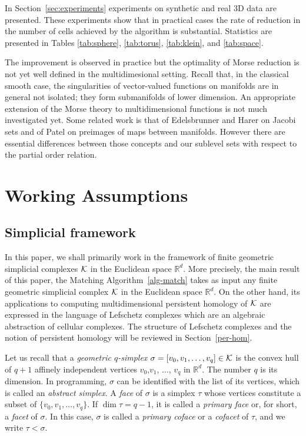 \documentclass[12pt]{article}
\newcommand{\R}{{\mathbb R}}
\newcommand{\cK}{{\cal K}}
\begin{document}
In Section~\ref{sec:experiments} experiments on synthetic and real 3D data are presented. These experiments show that in practical cases the rate of reduction in the number of cells achieved by the algorithm is substantial. Statistics are presented in Tables \ref{tab:sphere}, \ref{tab:torus}, \ref{tab:klein}, and \ref{tab:space}.

The improvement is observed in practice but the optimality of Morse reduction is not yet well defined in the multidimesional setting. Recall that, in the classical smooth case, the singularities of vector-valued functions on manifolds are in general not isolated; they form submanifolds of lower dimension. An appropriate extension of the Morse theory to multidimensional functions is not much investigated yet. Some related work is that of Edelsbrunner and Harer \cite{EdHa02} on Jacobi sets and of Patel \cite{Pat10} on preimages of maps between manifolds. However there are essential differences between those concepts and our sublevel sets with respect to the partial order relation.

\section{Working Assumptions}\label{sec:prel}


\subsection{Simplicial framework}\label{sec:simpl}

In this paper, we shall primarily work in the framework of finite geometric simplicial complexes $\cK$ in the Euclidean space $\R^d$. More precisely, the main result of this paper, the Matching Algorithm~\ref{alg-match} takes as input any finite geometric simplicial complex $\cK$ in the Euclidean space $\R^d$. On the other hand, its applications to computing multidimensional persistent homology of $\cK$ are expressed in the language of Lefschetz complexes which are an algebraic abstraction of cellular complexes. The structure of Lefschetz complexes and the notion of persistent homology will be reviewed in Section~\ref{per-hom}.

Let us recall that a {\em  geometric $q$-simplex} $\sigma = [v_0,v_1, \ldots, v_q]\in\cK$ is the convex hull of $q + 1$ affinely independent vertices $v_0$,$v_1$, $\ldots$, $v_q$ in $\R^d$. The number $q$ is its dimension. In programming, $\sigma$ can be identified with the list of its vertices, which is called an {\em abstract simplex}. A {\em face} of $\sigma$ is a simplex $\tau$ whose vertices constitute a subset of $\{v_0,v_1,\ldots ,v_q\}$. If $\dim \tau = q-1$, it is called a {\em primary face} or, for short, a {\em facet} of $\sigma$. In this case, $\sigma$ is called a {\em primary coface} or a {\em cofacet} of $\tau$, and we write $\tau < \sigma$.
\end{document}
